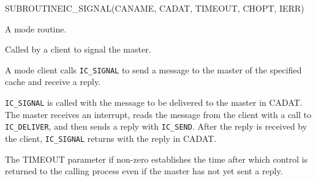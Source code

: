 \begin{routine} %
\subroutine
   {SUBROUTINE}{IC\_SIGNAL}{(CANAME, CADAT, TIMEOUT, CHOPT, IERR)}
\begin{overview}
A \mailbox mode routine.

Called by a client to signal the master.

\end{overview}
\begin{argdeflist}
\end{argdeflist}
\begin{describe}

A \mailbox mode client calls \verb|IC_SIGNAL| to send a message to the master of
the specified cache and receive a reply. 

\verb|IC_SIGNAL| is called
with the message to be delivered to the master in CADAT. The master
receives an interrupt, reads the message from the client with a call
to \verb!IC_DELIVER!, and then sends a reply with \verb!IC_SEND!.
After the reply is received by the client, \verb|IC_SIGNAL| returns
with the reply in CADAT.

The TIMEOUT parameter if non-zero establishes the time after which
control is returned to the calling process even if the master has not yet
sent a reply.

\end{describe}
\begin{options}
\end{options}
\begin{returncodes}
\end{returncodes}
\end{routine}


